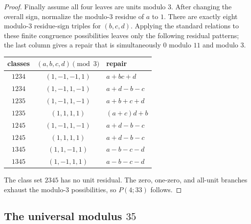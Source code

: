 \begin{proof}
Finally assume all four leaves are units modulo $3$.  After changing the
overall sign, normalize the modulo-$3$ residue of $a$ to $1$.  There are
exactly eight modulo-$3$ residue-sign triples for $(b,c,d)$.  Applying the
standard relations to these finite congruence possibilities leaves only the
following residual patterns; the last column gives a repair
that is simultaneously $0$ modulo $11$ and modulo $3$.
\small
\begin{center}
\begin{tabular}{@{}ccl@{}}
\toprule
classes & $(a,b,c,d)\pmod3$ & repair \\
\midrule
$1234$&$(1,-1,-1,1)$&$a+bc+d$\\
$1234$&$(1,-1,1,-1)$&$a+d-b-c$\\
$1235$&$(1,-1,1,-1)$&$a+b+c+d$\\
$1235$&$(1,1,1,1)$&$(a+c)d+b$\\
$1245$&$(1,-1,1,-1)$&$a+d-b-c$\\
$1245$&$(1,1,1,1)$&$a+d-b-c$\\
$1345$&$(1,1,-1,1)$&$a-b-c-d$\\
$1345$&$(1,-1,1,1)$&$a-b-c-d$\\
\bottomrule
\end{tabular}
\end{center}
\normalsize
The class set $2345$ has no unit residual.  The zero, one-zero, and all-unit
branches exhaust the modulo-$3$ possibilities, so $P(4;33)$ follows.
\end{proof}

\subsection{\texorpdfstring{The universal modulus $35$}{The universal modulus 35}}\label{app:p35}

